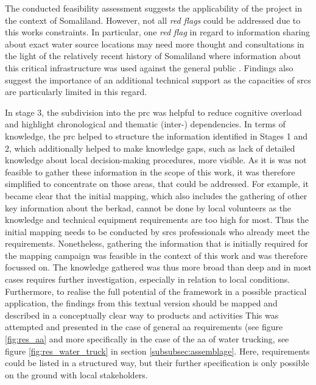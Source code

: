 The conducted feasibility assessment suggests the applicability of the project in the context of Somaliland. However, not all \textit{red flags} could be addressed due to this works constraints. In particular, one \textit{red flag} in regard to information sharing about exact water source locations may need more thought and consultations in the light of the relatively recent history of Somaliland where information about this critical infrastructure was used against the general public \autocite{republicofsomaliaRepublicSomalilandCountry2021}. Findings also suggest the importance of an additional technical support as the capacities of \acrshort{srcs} are particularly limited in this regard.

In stage 3, the subdivision into the \acrshort{prc} was helpful to reduce cognitive overload and highlight chronological and thematic (inter-) dependencies. In terms of knowledge, the \acrshort{prc} helped to structure the information identified in Stages 1 and 2,  which additionally helped to make knowledge gaps, such as lack of detailed knowledge about local decision-making procedures, more visible. As it is was not feasible to gather these information in the scope of this work, it was therefore simplified to concentrate on those areas, that could be addressed. For example, it became clear that the initial mapping, which also includes the gathering of other key information about the berkad, cannot be done by local volunteers as the knowledge and technical equipment requirements are too high for most. Thus the initial mapping needs to be conducted by \acrshort{srcs} professionals who already meet the requirements. Nonetheless, gathering the information that is initially required for the mapping campaign was feasible in the context of this work and was therefore focussed on. The knowledge gathered was thus more broad than deep and in most cases requires further investigation, especially in relation to local conditions. Furthermore, to realise the full potential of the framework in a possible practical application, the findings from this textual version should be mapped and described in a conceptually clear way to products and activities This was attempted and presented in the case of general \acrshort{aa} requirements (see figure \ref{fig:res_aa} and more specifically in the case of the \acrshort{aa} of water trucking, see figure \ref{fig:res_water_truck} in section \ref{subsubsec:assemblage}. Here, requirements could be listed in a structured way, but their further specification is only possible on the ground with local stakeholders.

